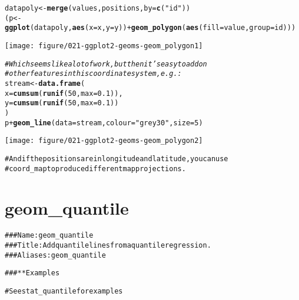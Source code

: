 \documentclass[a4paper,titlepage]{tufte-handout}\usepackage[]{graphicx}\usepackage[]{color}
\makeatletter
\def\maxwidth{ %
  \ifdim\Gin@nat@width>\linewidth
    \linewidth
  \else
    \Gin@nat@width
  \fi
}
\newcommand{\hlnum}[1]{\textcolor[rgb]{0.686,0.059,0.569}{#1}}%
\newcommand{\hlstr}[1]{\textcolor[rgb]{0.192,0.494,0.8}{#1}}%
\newcommand{\hlcom}[1]{\textcolor[rgb]{0.678,0.584,0.686}{\textit{#1}}}%
\newcommand{\hlopt}[1]{\textcolor[rgb]{0,0,0}{#1}}%
\newcommand{\hlstd}[1]{\textcolor[rgb]{0.345,0.345,0.345}{#1}}%
\newcommand{\hlkwb}[1]{\textcolor[rgb]{0.69,0.353,0.396}{#1}}%
\newcommand{\hlkwc}[1]{\textcolor[rgb]{0.333,0.667,0.333}{#1}}%
\newcommand{\hlkwd}[1]{\textcolor[rgb]{0.737,0.353,0.396}{\textbf{#1}}}%
\newenvironment{kframe}{%
 \def\at@end@of@kframe{}%
 \ifinner\ifhmode%
  \def\at@end@of@kframe{\end{minipage}}%
  \begin{minipage}{\columnwidth}%
 \fi\fi%
 \def\FrameCommand##1{\hskip\@totalleftmargin \hskip-\fboxsep
 \colorbox{shadecolor}{##1}\hskip-\fboxsep
     \hskip-\linewidth \hskip-\@totalleftmargin \hskip\columnwidth}%
 \MakeFramed {\advance\hsize-\width
   \@totalleftmargin\z@ \linewidth\hsize
   \@setminipage}}%
 {\par\unskip\endMakeFramed%
 \at@end@of@kframe}
\newenvironment{knitrout}{}{} %
\makeatother
\begin{document}
\begin{knitrout}
\begin{kframe}
\begin{alltt}
\hlstd{datapoly} \hlkwb{<-} \hlkwd{merge}\hlstd{(values, positions,} \hlkwc{by}\hlstd{=}\hlkwd{c}\hlstd{(}\hlstr{"id"}\hlstd{))}
\hlstd{(p} \hlkwb{<-} \hlkwd{ggplot}\hlstd{(datapoly,} \hlkwd{aes}\hlstd{(}\hlkwc{x}\hlstd{=x,} \hlkwc{y}\hlstd{=y))} \hlopt{+} \hlkwd{geom_polygon}\hlstd{(}\hlkwd{aes}\hlstd{(}\hlkwc{fill}\hlstd{=value,} \hlkwc{group}\hlstd{=id)))}
\end{alltt}
\end{kframe}
\texttt{[image: figure/021-ggplot2-geoms-geom\_polygon1]} 
\begin{kframe}\begin{alltt}
\hlcom{# Which seems like a lot of work, but then it's easy to add on}
\hlcom{# other features in this coordinate system, e.g.:}
\hlstd{stream} \hlkwb{<-} \hlkwd{data.frame}\hlstd{(}
  \hlkwc{x} \hlstd{=} \hlkwd{cumsum}\hlstd{(}\hlkwd{runif}\hlstd{(}\hlnum{50}\hlstd{,} \hlkwc{max} \hlstd{=} \hlnum{0.1}\hlstd{)),}
  \hlkwc{y} \hlstd{=} \hlkwd{cumsum}\hlstd{(}\hlkwd{runif}\hlstd{(}\hlnum{50}\hlstd{,}\hlkwc{max} \hlstd{=} \hlnum{0.1}\hlstd{))}
\hlstd{)}
\hlstd{p} \hlopt{+} \hlkwd{geom_line}\hlstd{(}\hlkwc{data} \hlstd{= stream,} \hlkwc{colour}\hlstd{=}\hlstr{"grey30"}\hlstd{,} \hlkwc{size} \hlstd{=} \hlnum{5}\hlstd{)}
\end{alltt}
\end{kframe}
\texttt{[image: figure/021-ggplot2-geoms-geom\_polygon2]} 
\begin{kframe}\begin{alltt}

# And if the positions are in longitude and latitude, you can use
# coord_map to produce different map projections.


\end{alltt}
\end{kframe}
\end{knitrout}



\section{geom\_quantile}

\begin{knitrout}
\color{fgcolor}\begin{kframe}
\begin{alltt}
### Name: geom_quantile
### Title: Add quantile lines from a quantile regression.
### Aliases: geom_quantile

### ** Examples

# See stat_quantile for examples



\end{alltt}
\end{kframe}
\end{knitrout}
\end{document}
